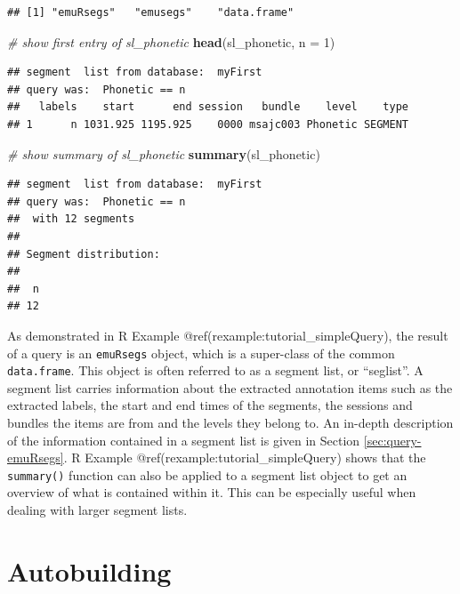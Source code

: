 \documentclass[]{book}
\newenvironment{Shaded}{\begin{snugshade}}{\end{snugshade}}
\newcommand{\CommentTok}[1]{\textcolor[rgb]{0.56,0.35,0.01}{\textit{#1}}}
\newcommand{\DataTypeTok}[1]{\textcolor[rgb]{0.13,0.29,0.53}{#1}}
\newcommand{\DecValTok}[1]{\textcolor[rgb]{0.00,0.00,0.81}{#1}}
\newcommand{\KeywordTok}[1]{\textcolor[rgb]{0.13,0.29,0.53}{\textbf{#1}}}
\newcommand{\NormalTok}[1]{#1}
\theoremstyle{definition}
\theoremstyle{definition}
\theoremstyle{definition}
\theoremstyle{remark}
\begin{document}
\begin{verbatim}
## [1] "emuRsegs"   "emusegs"    "data.frame"
\end{verbatim}

\begin{Shaded}
\begin{Highlighting}[]
\CommentTok{# show first entry of sl_phonetic}
\KeywordTok{head}\NormalTok{(sl_phonetic, }\DataTypeTok{n =} \DecValTok{1}\NormalTok{)}
\end{Highlighting}
\end{Shaded}

\begin{verbatim}
## segment  list from database:  myFirst 
## query was:  Phonetic == n 
##   labels    start      end session   bundle    level    type
## 1      n 1031.925 1195.925    0000 msajc003 Phonetic SEGMENT
\end{verbatim}

\begin{Shaded}
\begin{Highlighting}[]
\CommentTok{# show summary of sl_phonetic}
\KeywordTok{summary}\NormalTok{(sl_phonetic)}
\end{Highlighting}
\end{Shaded}

\begin{verbatim}
## segment  list from database:  myFirst 
## query was:  Phonetic == n 
##  with 12 segments
## 
## Segment distribution:
## 
##  n 
## 12
\end{verbatim}

As demonstrated in R Example @ref(rexample:tutorial\_simpleQuery), the
result of a query is an \texttt{emuRsegs} object, which is a super-class
of the common \texttt{data.frame}. This object is often referred to as a
segment list, or ``seglist''. A segment list carries information about
the extracted annotation items such as the extracted labels, the start
and end times of the segments, the sessions and bundles the items are
from and the levels they belong to. An in-depth description of the
information contained in a segment list is given in Section
\ref{sec:query-emuRsegs}. R Example @ref(rexample:tutorial\_simpleQuery)
shows that the \texttt{summary()} function can also be applied to a
segment list object to get an overview of what is contained within it.
This can be especially useful when dealing with larger segment lists.

\hypertarget{autobuilding}{%
\section{Autobuilding}\label{autobuilding}}
\end{document}
